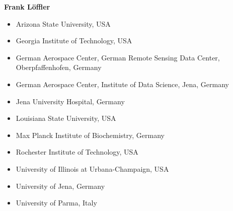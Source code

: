 \documentclass[11pt,a4paper]{scrlttr2}
\begin{document}
\begin{letter}{}
\textbf{Frank Löffler}
\begin{itemize}
 \setlength\itemsep{0em}
\item Arizona State University, USA
\item Georgia Institute of Technology, USA
\item German Aerospace Center, German Remote Sensing Data Center, Oberpfaffenhofen, Germany
\item German Aerospace Center, Institute of Data Science, Jena, Germany
\item Jena University Hospital, Germany
\item Louisiana State University, USA
\item Max Planck Institute of Biochemistry, Germany
\item Rochester Institute of Technology, USA
\item University of Illinois at Urbana-Champaign, USA
\item University of Jena, Germany
\item University of Parma, Italy
\end{itemize}



\end{letter}
\end{document}
